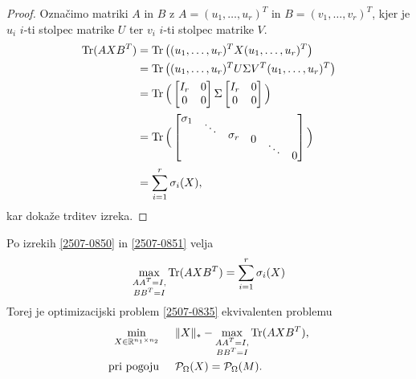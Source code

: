 \begin{proof}
    Označimo matriki $A$ in $B$ z
    $A = (u_1, \hdots , u_r)^T$ in $B = (v_1, \hdots , v_r)^T$,
    kjer je $u_i$ $i$-ti stolpec matrike $U$ ter $v_i$ $i$-ti stolpec
    matrike $V$.
    \begin{align*}
        \operatorname{Tr}(AXB^T) & = \operatorname{Tr}\big((u_1, \hdots , u_r)^T X (u_1, \hdots , u_r)^T\big)                                                                                                                                                                   \\
                   & = \operatorname{Tr}\big((u_1, \hdots , u_r)^T U \Sigma V^T (u_1, \hdots , u_r)^T\big)                                                                                                                                                        \\
                   & =\operatorname{Tr}\Big( \begin{bmatrix} I_r & 0 \\ 0 & 0 \end{bmatrix} \Sigma \begin{bmatrix} I_r & 0 \\ 0 & 0 \end{bmatrix}\Big)                                                                                                                 \\
                   & = \operatorname{Tr}\Big(\begin{bmatrix} \sigma_1 \\[-8pt] & \ddots & & \\[-8pt] & & \sigma_r \\[-8pt] & &  & 0 \\[-8pt]  & & & & \ddots \\[-8pt] & & & & & 0 \end{bmatrix}\Big) \\
                   &= \sum_{i = 1}^{r} \sigma_i(X),
    \end{align*}
kar dokaže trditev izreka.
\end{proof}
Po izrekih \ref{2507-0850} in \ref{2507-0851}
velja
\[
    \max_{
    \substack{AA^T = I,\\ BB^T = I}} \operatorname{Tr}(AXB^T) = \sum^{r}_{i = 1} \sigma_i(X)
\]
Torej je optimizacijski problem
\eqref{2507-0835} ekvivalenten
problemu
\begin{align*}
    \min_{X\in  \mathbb{R}^{n_1 \times n_2}}\hspace{0.5cm}             & \lVert X\rVert_* - \max_{\substack{AA^T = I,\\ BB^T = I}} \operatorname{Tr}(AXB^T), \\
    \text{pri pogoju} \hspace{0.5cm} & \mathcal{P}_\Omega(X) = \mathcal{P}_\Omega(M).
\end{align*}

